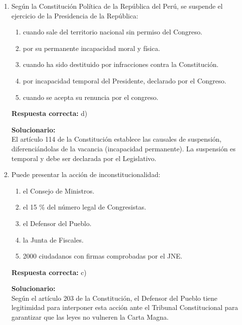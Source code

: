 \begin{enumerate}
	\item Según la Constitución Política de la República del Perú, se suspende el ejercicio de la Presidencia de la República:
	\begin{enumerate}[label=\alph*)]
		\item cuando sale del territorio nacional sin permiso del Congreso.
		\item por su permanente incapacidad moral y física.
		\item cuando ha sido destituido por infracciones contra la Constitución.
		\item por incapacidad temporal del Presidente, declarado por el Congreso.
		\item cuando se acepta su renuncia por el congreso.
	\end{enumerate}
	\textbf{Respuesta correcta:} d)
	
	\vspace{2mm}
	\textbf{Solucionario:}\\
	El artículo 114 de la Constitución establece las causales de suspensión, diferenciándolas de la vacancia (incapacidad permanente). La suspensión es temporal y debe ser declarada por el Legislativo.
	
	\vspace{6mm}
	
	\item Puede presentar la acción de inconstitucionalidad:
	\begin{enumerate}[label=\alph*)]
		\item el Consejo de Ministros.
		\item el 15 \% del número legal de Congresistas.
		\item el Defensor del Pueblo.
		\item la Junta de Fiscales.
		\item 2000 ciudadanos con firmas comprobadas por el JNE.
	\end{enumerate}
	\textbf{Respuesta correcta:} c)
	
	\vspace{2mm}
	\textbf{Solucionario:}\\
	Según el artículo 203 de la Constitución, el Defensor del Pueblo tiene legitimidad para interponer esta acción ante el Tribunal Constitucional para garantizar que las leyes no vulneren la Carta Magna.
	
	\vspace{6mm}
	

\end{enumerate}
